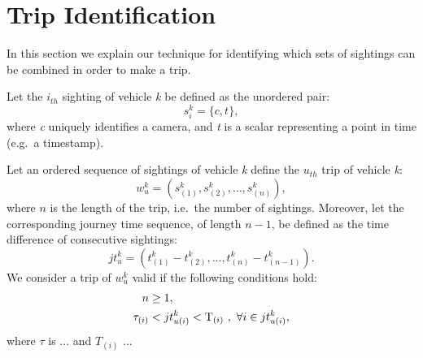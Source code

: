 \section{Trip Identification}\label{s.trips}

In this section we explain our technique for identifying which sets of sightings can be combined in order to make a trip.

Let the $i_{th}$ sighting of vehicle \emph{k} be defined as the unordered pair:
\begin{equation} \label{e.sighting}
s^{k}_{i} = \{ c, t \},
\end{equation}
where \emph{c} uniquely identifies a camera, and \emph{t} is a scalar representing a point in time (e.g.\ a timestamp).

Let an ordered sequence of sightings of vehicle \emph{k} define the $u_{th}$ trip of vehicle \emph{k}:
\begin{equation} \label{e.trip}
w^{k}_{u} = \left(s^{k}_{(1)}, s^{k}_{(2)}, \dots , s^{k}_{(n)}\right),
\end{equation}
where \( n \) is the length of the trip, i.e.\ the number of sightings. Moreover, let the corresponding journey time sequence, of length \(n-1\), be defined as the time difference of consecutive sightings:
\begin{equation} \label{e.journeytime}
jt^{k}_{u} = \left(t^{k}_{(1)} - t^{k}_{(2)}, \ldots, t^{k}_{(n)} - t^{k}_{(n-1)} \right).
\end{equation}
We consider a trip of \emph{$w^k_u$} valid if the following conditions hold:
\begin{align}
n &\ge 1 , \label{e.trip.constraints.1} \\
\tau_{(i)} &< jt^{k}_{u(i)} < \mathrm{T}_{(i)} \ , \ \forall i \in jt^{k}_{u(i)} \label{e.trip.constraints.2},
\end{align}
{\color{blue}where $\tau$ is ... and $T_{(i)}$ ...}

